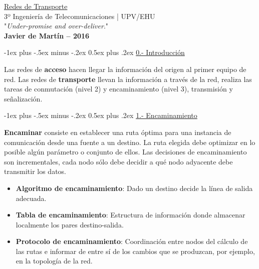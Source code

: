 \documentclass[10pt,portrait, twocolumn]{article}
\makeatletter
\renewcommand{\section}{\@startsection{section}{1}{0mm}%
                                {-1ex plus -.5ex minus -.2ex}%
                                {0.5ex plus .2ex}%
                                {\normalfont\large\bfseries}}
\makeatother
\begin{document}
\begin{framed}
	\begin{center}
    	\Large{\underline{Redes de Transporte}} \\
    	\scriptsize{3º Ingeniería de Telecomunicaciones | UPV/EHU}\\
     	"\textsl{Under-promise and over-deliver}." \\
     	\small{\textbf{Javier de Martín -- 2016}}
	\end{center}
\end{framed}


\begin{center}
\section{\underline{0.- Introducción}}
\end{center}

Las redes de \textbf{acceso} hacen llegar la información del origen al primer equipo de red. Las redes de \textbf{transporte} llevan la información a través de la red, realiza las tareas de conmutación (nivel 2) y encaminamiento (nivel 3), transmisión y señalización.

\hrulefill

\section{\underline{1.- Encaminamiento}}

\textbf{Encaminar} consiste en establecer una ruta óptima para una instancia de comunicación desde una fuente a un destino. La ruta elegida debe optimizar en lo posible algún parámetro o conjunto de ellos. Las decisiones de encaminamiento son incrementales, cada nodo sólo debe decidir a qué nodo adyacente debe transmitir los datos.

\begin{itemize}
	\item \textbf{Algoritmo de encaminamiento}: Dado un destino decide la línea de salida adecuada.
	\item \textbf{Tabla de encaminamiento}: Estructura de información donde almacenar localmente los pares destino-salida.
	\item \textbf{Protocolo de encaminamiento}: Coordinación entre nodos del cálculo de las rutas e informar de entre sí de los cambios que se produzcan, por ejemplo, en la topología de la red.
\end{itemize}
\end{document}
